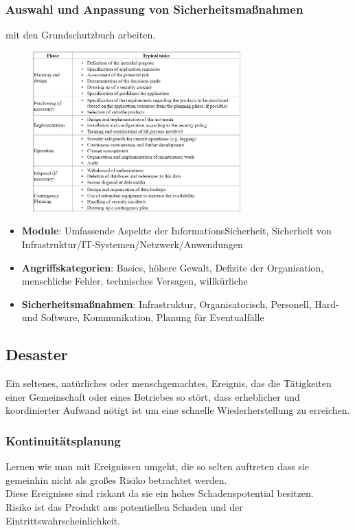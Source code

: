 \documentclass{article} %
\begin{document}
\subsubsection{Auswahl und Anpassung von Sicherheitsmaßnahmen}
mit den Grundschutzbuch arbeiten.\\
\begin{figure}[h]
	\centering
		\includegraphics[width=8cm]{img/Grundschutz.JPG}
	\label{fig:Grundschutz}
\end{figure}
\begin{itemize}
	\item \textbf{Module}: Umfassende Aspekte der InformationsSicherheit, Sicherheit von Infrastruktur/IT-Systemen/Netzwerk/Anwendungen
	\item \textbf{Angriffskategorien}: Basics, höhere Gewalt, Defizite der Organisation, menschliche Fehler, technisches Versagen, willkürliche
	\item \textbf{Sicherheitsmaßnahmen}: Infrastruktur, Organisatorisch, Personell, Hard- und Software, Kommunikation, Planung für Eventualfälle
\end{itemize}
\subsection{Desaster}
Ein seltenes, natürliches oder menschgemachtes, Ereignis, das die Tätigkeiten einer Gemeinschaft oder eines Betriebes so stört, dass erheblicher und koordinierter Aufwand nötigt ist um eine schnelle Wiederherstellung zu erreichen.
\subsubsection{Kontinuitätsplanung}
Lernen wie man mit Ereignissen umgeht, die so selten auftreten dass sie gemeinhin nicht als großes Risiko betrachtet werden.\\
Diese Ereignisse sind riskant da sie ein hohes Schadenspotential besitzen.\\
Risiko ist das Produkt aus potentiellen Schaden und der Eintrittswahrscheinlichkeit.
\end{document}
